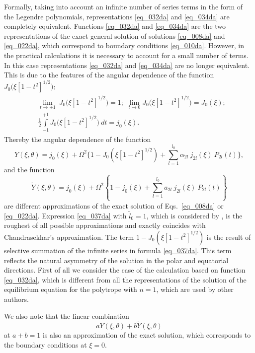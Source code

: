 \documentclass{caosp308}
\begin{document}
Formally, taking into account an infinite number of series terms in the form of the Legendre polynomials, representations  \eqref{eq_032da} and \eqref{eq_034da} are completely equivalent. Functions \eqref{eq_032da} and \eqref{eq_034da} are the two representations of the exact general solution of solutions \eqref{eq_008da} and \eqref{eq_022da}, which correspond to boundary conditions \eqref{eq_010da}. However, in the practical calculations it is necessary to account for a small number of terms. In this case representations \eqref{eq_032da} and \eqref{eq_034da} are no longer equivalent. This is due to the features of the angular dependence of the function $J_0 \bigl(\xi[1-t^2]^{1/2}\bigl)$:
\begin{eqnarray}
\label{eq_035da}
\begin{split}
& \lim_{t\to \pm 1}\:J_0 \bigl(\xi[1-t^2]^{1/2}\bigl) =1;\,\,
\lim_{t\to 0} J_0 \bigl(\xi[1-t^2]^{1/2}\bigl) = J_0 (\xi); \\
&\frac{1}{2}\int\limits^{+1}_{-1} J_0 \bigl(\xi[1-t^2]^{1/2}\bigl)\:dt = j_0 (\xi).
\end{split}
\end{eqnarray}
Thereby the angular dependence of the function
\begin{equation}
\label{eq_036da}
Y(\xi,\theta) = j_0 (\xi) +\Omega^2 \biggl\{1-J_0 (\xi[1-t^2]^{1/2}) + \sum^{l_0}_{l=1}
\alpha_{2l}\:j_{2l} (\xi)\:P_{2l} (t)\biggr\},
\end{equation}
and the function
\begin{equation}
\label{eq_037da}
\tilde Y(\xi,\theta)=j_0 (\xi) + \Omega^2 \left\{1-j_0 (\xi) + \sum^{\tilde{l}_0}_{l=1}
a_{2l}\:j_{2l} (\xi)\:P_{2l} (t)\right\}
\end{equation}
are different approximations of the exact solution of  Eqs.~\eqref{eq_008da} or \eqref{eq_022da}. Expression \eqref{eq_037da} with $\tilde{l}_0=1$, which is considered by \citet{1980Ap&SS..71..415C}, is the roughest of all possible approximations and exactly coincides with  Chandrasekhar's approximation. The term $1-J_0 (\xi[1-t^2]^{1/2})$ is the result of selective summation of the infinite series in formula \eqref{eq_037da}. This term reflects the natural asymmetry of the solution in the polar and equatorial directions. First of all we consider the case of the calculation based on function  \eqref{eq_032da}, which is different from all the representations of the solution of the equilibrium equation for the polytrope with $n=1$, which are used by other authors.

We also note that the linear combination
\begin{equation}
\label{eq_038da}
aY(\xi,\theta)+b\tilde{Y}(\xi,\theta)
\end{equation}
at $a+b=1$ is also an approximation of the exact solution, which corresponds to the boundary conditions at $\xi=0$.
\end{document}
